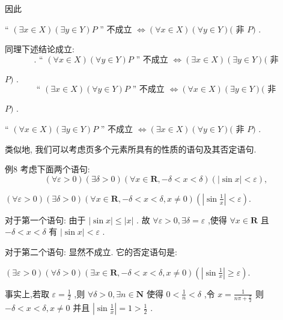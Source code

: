 因此

“ $\left( {\exists x \in  X}\right) \left( {\exists y \in  Y}\right) P$ ” 不成立 $\Leftrightarrow  \left( {\forall x \in  X}\right) \left( {\forall y \in  Y}\right) ($ 非 $P)$ .

同理下述结论成立:
$$\text{ . “ }\left( {\forall x \in  X}\right) \left( {\forall y \in  Y}\right) P\text{ ” 不成立 } \Leftrightarrow  \left( {\exists x \in  X}\right) \left( {\exists y \in  Y}\right) (\text{ 非 }$$

$P)$ .
$$\text{ “ }\left( {\exists x \in  X}\right) \left( {\forall y \in  Y}\right) P\text{ ” 不成立 } \Leftrightarrow  \left( {\forall x \in  X}\right) \left( {\exists y \in  Y}\right) (\text{ 非 }$$

$P)$ .

“ $\left( {\forall x \in  X}\right) \left( {\exists y \in  Y}\right) P$ ” 不成立 $\Leftrightarrow  \left( {\exists x \in  X}\right) \left( {\forall y \in  Y}\right) ($ 非 $P)$ .

类似地, 我们可以考虑页多个元素所具有的性质的语句及其否定语句.

例8 考虑下面两个语句:
$$\left( {\forall \varepsilon  > 0}\right) \left( {\exists \delta  > 0}\right) \left( {\forall x \in  \mathbf{R}, - \delta  < x < \delta }\right) \left( {\left| {\sin x}\right|  < \varepsilon }\right) ,$$

$\left( {\forall \varepsilon  > 0}\right) \left( {\exists \delta  > 0}\right) \left( {\forall x \in  \mathbf{R}, - \delta  < x < \delta ,x \neq  0}\right) \left( {\left| {\sin \frac{1}{x}}\right|  < \varepsilon }\right) .$

对于第一个语句: 由于 $\left| {\sin x}\right|  \leq  \left| x\right|$ . 故 $\forall \varepsilon  > 0,\exists \delta  = \varepsilon$ ,使得 $\forall x \in  \mathbf{R}$ 且 $- \delta  < x < \delta$ 有 $\left| {\sin x}\right|  < \varepsilon$ .

对于第二个语句: 显然不成立. 它的否定语句是:

$\left( {\exists \varepsilon  > 0}\right) \left( {\forall \delta  > 0}\right) \left( {\exists x \in  \mathbf{R}, - \delta  < x < \delta ,x \neq  0}\right) \left( {\left| {\sin \frac{1}{x}}\right|  \geq  \varepsilon }\right) .$

事实上,若取 $\varepsilon  = \frac{1}{2}$ ,则 $\forall \delta  > 0,\exists n \in  \mathbf{N}$ 使得 $0 < \frac{1}{n} < \delta$ ,令 $x = \frac{1}{{n\pi } + \frac{\pi }{2}}$ 则 $- \delta  < x < \delta ,x \neq  0$ 并且 $\left| {\sin \frac{1}{x}}\right|  = 1 > \frac{1}{2}$ .

